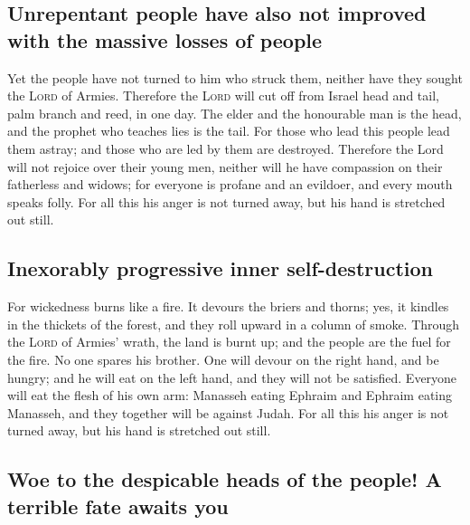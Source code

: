 \hypertarget{unrepentant-people-have-also-not-improved-with-the-massive-losses-of-people}{%
\subsection{Unrepentant people have also not improved with the massive
losses of
people}\label{unrepentant-people-have-also-not-improved-with-the-massive-losses-of-people}}

 Yet the people have not turned to him who struck them,
neither have they sought the \textsc{Lord} of Armies. 
Therefore the \textsc{Lord} will cut off from Israel head and tail, palm
branch and reed, in one day.  The elder and the
honourable man is the head, and the prophet who teaches lies is the
tail.  For those who lead this people lead them astray;
and those who are led by them are destroyed.  Therefore
the Lord will not rejoice over their young men, neither will he have
compassion on their fatherless and widows; for everyone is profane and
an evildoer, and every mouth speaks folly. For all this his anger is not
turned away, but his hand is stretched out still.

\hypertarget{inexorably-progressive-inner-self-destruction}{%
\subsection{Inexorably progressive inner
self-destruction}\label{inexorably-progressive-inner-self-destruction}}

 For wickedness burns like a fire. It devours the briers
and thorns; yes, it kindles in the thickets of the forest, and they roll
upward in a column of smoke.  Through the \textsc{Lord}
of Armies' wrath, the land is burnt up; and the people are the fuel for
the fire. No one spares his brother.  One will devour on
the right hand, and be hungry; and he will eat on the left hand, and
they will not be satisfied. Everyone will eat the flesh of his own arm:
 Manasseh eating Ephraim and Ephraim eating Manasseh, and
they together will be against Judah. For all this his anger is not
turned away, but his hand is stretched out still.

\hypertarget{woe-to-the-despicable-heads-of-the-people-a-terrible-fate-awaits-you}{%
\subsection{Woe to the despicable heads of the people! A terrible fate
awaits
you}\label{woe-to-the-despicable-heads-of-the-people-a-terrible-fate-awaits-you}}

